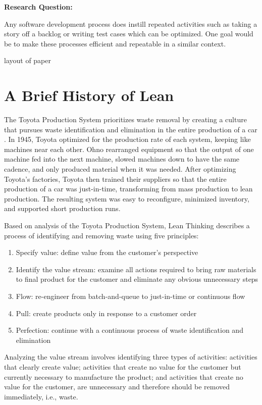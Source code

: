 \textbf{Research Question: }

Any software development process does instill repeated activities such as taking a story off a backlog or writing test cases which can be optimized. One goal would be to make these processes efficient and repeatable in a similar context. 

{layout of paper}


\section{A Brief History of Lean}

The Toyota Production System prioritizes waste removal by creating a culture that pursues waste identification and elimination in the entire production of a car \cite{OhnoToyotaProductionSystem, ShingoToyotaProductionSystem}. In 1945, Toyota optimized for the production rate of each system, keeping like machines near each other. Ohno rearranged equipment so that the output of one machine fed into the next machine, slowed machines down to have the same cadence, and only produced material when it was needed. After optimizing Toyota's factories, Toyota then trained their suppliers so that the entire production of a car was just-in-time, transforming from mass production to lean production. The resulting  system was easy to reconfigure, minimized inventory, and supported short production runs.  

Based on analysis of the Toyota Production System, Lean Thinking \cite{WomackLeanThinking} describes a process of identifying and removing waste using five principles:
\begin{enumerate}
\item Specify value: define value from the customer's perspective
\item Identify the value stream: examine all actions required to bring raw materials to final product for the customer and eliminate any obvious unnecessary steps
\item Flow: re-engineer from batch-and-queue to just-in-time or continuous flow 
\item Pull: create products only in response to a customer order
\item Perfection: continue with a continuous process of waste identification and elimination
\end{enumerate}

Analyzing the value stream involves identifying three types of activities: activities that clearly create value; activities that create no value for the customer but currently necessary to manufacture the product; and activities that create no value for the customer, are unnecessary and therefore should be removed immediately, i.e., waste.

